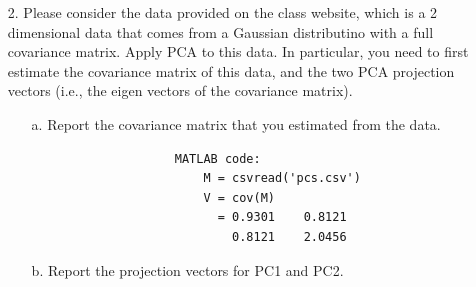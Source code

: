 \documentclass[12pt,letterpaper]{article}
\begin{document}
\begin{enumerate}
\begin{enumerate}
	\end{enumerate} 
	\item[2.] Please consider the data provided on the class website, which is a 2 dimensional data that comes from a Gaussian distributino with a full covariance matrix. Apply PCA to this data. In particular, you need to first estimate the covariance matrix of this data, and the two PCA projection vectors (i.e., the eigen vectors of the covariance matrix). \\
	\begin{enumerate} 
		\item[a.] Report the covariance matrix that you estimated from the data. \\
				\begin{verbatim} 
					MATLAB code:
						M = csvread('pcs.csv')
						V = cov(M)
						  = 0.9301    0.8121
							0.8121    2.0456
				\end{verbatim} 
		\item[b.] Report the projection vectors for PC1 and PC2. \\
				\begin{verbatim} 	


\end{verbatim}
\end{enumerate}
\end{enumerate}
\end{document}

